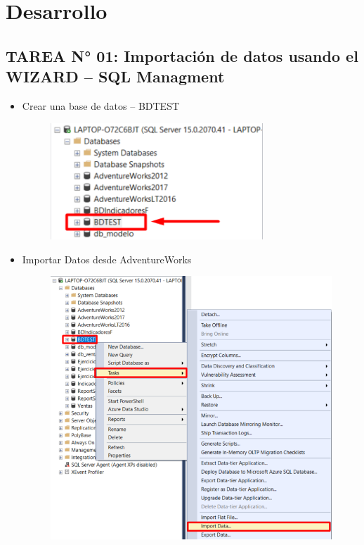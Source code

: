 \documentclass{article}
\begin{document}
\newpage

\section{Desarrollo}


\subsection{TAREA N° 01: Importación de datos usando el WIZARD – SQL Managment}

\begin{itemize}
\item Crear una base de datos – BDTEST
	\begin{figure}[htb]
		\begin{center}
			\includegraphics[width=8cm]{./images/Tarea1_1}
			
		\end{center}
	\end{figure}
\item Importar Datos desde AdventureWorks
	\begin{figure}[htb]
		\begin{center}
			\includegraphics[width=13cm]{./images/Tarea1_2}
			

\end{center}
\end{figure}
\end{itemize}
\end{document}
